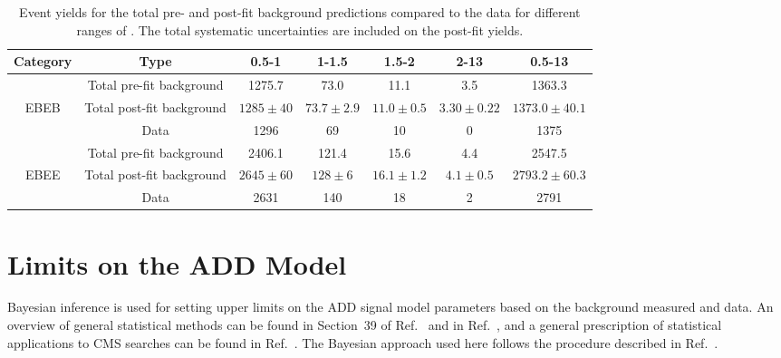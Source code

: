\begin{table}[!htbp]
	\footnotesize %
	\caption{Event yields for the total pre- and post-fit background predictions compared to the data for different ranges of \mgg. The total systematic uncertainties are included on the post-fit yields.}
	\label{tab:event_yields}
	\centering
	\vspace{\baselineskip}
	\begin{tabular}{cc|cccc|c}
		\hline \hline
		Category & Type & 0.5-1\TeV & 1-1.5\TeV & 1.5-2\TeV & 2-13\TeV & 0.5-13\TeV \\ 
		\hline
		&  Total pre-fit background & 1275.7 & 73.0 & 11.1 & 3.5 & 1363.3 \\ 
		EBEB & Total post-fit background & $1285\pm40$ & $73.7\pm2.9$ & $11.0\pm0.5$ & $3.30\pm0.22$ & $1373.0\pm40.1$ \\ 
		& Data & 1296 & 69 & 10 & 0 & 1375 \\ 
		\hline
		& Total pre-fit background & 2406.1 & 121.4 & 15.6 & 4.4 & 2547.5 \\ 
		EBEE & Total post-fit background & $2645\pm60$ & $128\pm6$ & $16.1\pm1.2$ & $4.1\pm0.5$ & $2793.2\pm60.3$ \\ 
		& Data & 2631 & 140 & 18 & 2 & 2791 \\ 
		\hline \hline
	\end{tabular}
\end{table}

\pagebreak


\section{Limits on the ADD Model}\label{sec:limit_setting}

Bayesian inference is used for setting upper limits on the ADD signal model parameters based on the background measured and data. An overview of general statistical methods can be found in Section~39 of Ref.~\cite{Tanabashi:2018oca} and in Ref.~\cite{Cousins:2018tiz}, and a general prescription of statistical applications to CMS searches can be found in Ref.~\cite{CMS-NOTE-2011-005}. The Bayesian approach used here follows the procedure described in Ref.~\cite{Bertram:2000br}.

